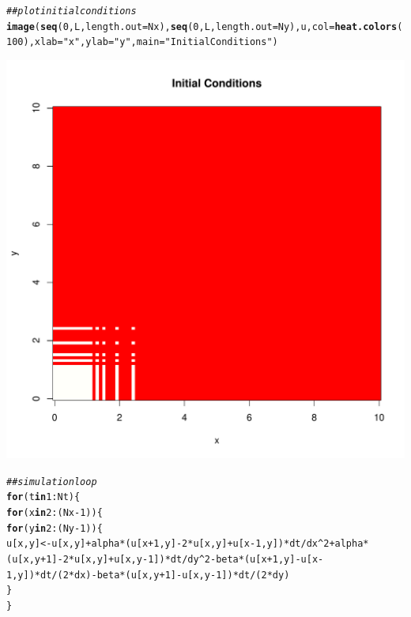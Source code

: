 \documentclass{tufte-handout}\usepackage[]{graphicx}\usepackage[]{xcolor}
\makeatletter
\def\maxwidth{ %
  \ifdim\Gin@nat@width>\linewidth
    \linewidth
  \else
    \Gin@nat@width
  \fi
}
\newcommand{\hlnum}[1]{\textcolor[rgb]{0.686,0.059,0.569}{#1}}%
\newcommand{\hlstr}[1]{\textcolor[rgb]{0.192,0.494,0.8}{#1}}%
\newcommand{\hlcom}[1]{\textcolor[rgb]{0.678,0.584,0.686}{\textit{#1}}}%
\newcommand{\hlopt}[1]{\textcolor[rgb]{0,0,0}{#1}}%
\newcommand{\hlstd}[1]{\textcolor[rgb]{0.345,0.345,0.345}{#1}}%
\newcommand{\hlkwa}[1]{\textcolor[rgb]{0.161,0.373,0.58}{\textbf{#1}}}%
\newcommand{\hlkwb}[1]{\textcolor[rgb]{0.69,0.353,0.396}{#1}}%
\newcommand{\hlkwc}[1]{\textcolor[rgb]{0.333,0.667,0.333}{#1}}%
\newcommand{\hlkwd}[1]{\textcolor[rgb]{0.737,0.353,0.396}{\textbf{#1}}}%
\newenvironment{kframe}{%
 \def\at@end@of@kframe{}%
 \ifinner\ifhmode%
  \def\at@end@of@kframe{\end{minipage}}%
  \begin{minipage}{\columnwidth}%
 \fi\fi%
 \def\FrameCommand##1{\hskip\@totalleftmargin \hskip-\fboxsep
 \colorbox{shadecolor}{##1}\hskip-\fboxsep
     \hskip-\linewidth \hskip-\@totalleftmargin \hskip\columnwidth}%
 \MakeFramed {\advance\hsize-\width
   \@totalleftmargin\z@ \linewidth\hsize
   \@setminipage}}%
 {\par\unskip\endMakeFramed%
 \at@end@of@kframe}
\newenvironment{knitrout}{}{} %
\makeatother
\begin{document}
\begin{knitrout}
\begin{kframe}
\begin{alltt}
\hlcom{## plot initial conditions}
\hlkwd{image}\hlstd{(}\hlkwd{seq}\hlstd{(}\hlnum{0}\hlstd{, L,} \hlkwc{length.out} \hlstd{= Nx),} \hlkwd{seq}\hlstd{(}\hlnum{0}\hlstd{, L,} \hlkwc{length.out} \hlstd{= Ny), u,} \hlkwc{col} \hlstd{=} \hlkwd{heat.colors}\hlstd{(}\hlnum{100}\hlstd{),} \hlkwc{xlab} \hlstd{=} \hlstr{"x"}\hlstd{,} \hlkwc{ylab} \hlstd{=} \hlstr{"y"}\hlstd{,} \hlkwc{main} \hlstd{=} \hlstr{"Initial Conditions"}\hlstd{)}
\end{alltt}
\end{kframe}
\includegraphics[width=\maxwidth]{figure/unnamed-chunk-4-1} 
\begin{kframe}\begin{alltt}
\hlcom{## simulation loop}
\hlkwa{for} \hlstd{(t} \hlkwa{in} \hlnum{1}\hlopt{:}\hlstd{Nt) \{}
  \hlkwa{for} \hlstd{(x} \hlkwa{in} \hlnum{2}\hlopt{:}\hlstd{(Nx} \hlopt{-} \hlnum{1}\hlstd{)) \{}
    \hlkwa{for} \hlstd{(y} \hlkwa{in} \hlnum{2}\hlopt{:}\hlstd{(Ny} \hlopt{-} \hlnum{1}\hlstd{)) \{}
      \hlstd{u[x, y]} \hlkwb{<-} \hlstd{u[x, y]} \hlopt{+} \hlstd{alpha} \hlopt{*} \hlstd{(u[x} \hlopt{+} \hlnum{1}\hlstd{, y]} \hlopt{-} \hlnum{2} \hlopt{*} \hlstd{u[x, y]} \hlopt{+} \hlstd{u[x} \hlopt{-} \hlnum{1}\hlstd{, y])} \hlopt{*} \hlstd{dt} \hlopt{/} \hlstd{dx}\hlopt{^}\hlnum{2} \hlopt{+} \hlstd{alpha} \hlopt{*} \hlstd{(u[x, y} \hlopt{+} \hlnum{1}\hlstd{]} \hlopt{-} \hlnum{2} \hlopt{*} \hlstd{u[x, y]} \hlopt{+} \hlstd{u[x, y} \hlopt{-} \hlnum{1}\hlstd{])} \hlopt{*} \hlstd{dt} \hlopt{/} \hlstd{dy}\hlopt{^}\hlnum{2} \hlopt{-} \hlstd{beta} \hlopt{*} \hlstd{(u[x} \hlopt{+} \hlnum{1}\hlstd{, y]} \hlopt{-} \hlstd{u[x} \hlopt{-} \hlnum{1}\hlstd{, y])} \hlopt{*} \hlstd{dt} \hlopt{/} \hlstd{(}\hlnum{2} \hlopt{*} \hlstd{dx)} \hlopt{-} \hlstd{beta} \hlopt{*} \hlstd{(u[x, y} \hlopt{+} \hlnum{1}\hlstd{]} \hlopt{-} \hlstd{u[x, y} \hlopt{-} \hlnum{1}\hlstd{])} \hlopt{*} \hlstd{dt} \hlopt{/} \hlstd{(}\hlnum{2} \hlopt{*} \hlstd{dy)}
    \hlstd{\}}
  \hlstd{\}}


\end{alltt}
\end{kframe}
\end{knitrout}
\end{document}
